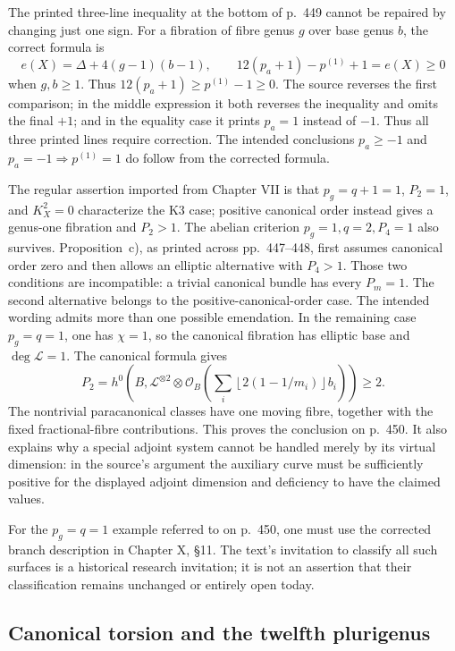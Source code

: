 The printed three-line inequality at the bottom of p.~449 cannot be repaired by changing just one sign. For a fibration of fibre genus \(g\) over base genus \(b\), the correct formula is
\[
e(X)=\Delta+4(g-1)(b-1),\qquad
12(p_a+1)-p^{(1)}+1=e(X)\ge0
\]
when \(g,b\ge1\). Thus \(12(p_a+1)\ge p^{(1)}-1\ge0\). The source reverses the first comparison; in the middle expression it both reverses the inequality and omits the final \(+1\); and in the equality case it prints \(p_a=1\) instead of \(-1\). Thus all three printed lines require correction. The intended conclusions \(p_a\ge-1\) and \(p_a=-1\Rightarrow p^{(1)}=1\) do follow from the corrected formula.

The regular assertion imported from Chapter VII is that \(p_g=q+1=1\), \(P_2=1\), and \(K_X^2=0\) characterize the K3 case; positive canonical order instead gives a genus-one fibration and \(P_2>1\). The abelian criterion \(p_g=1,q=2,P_4=1\) also survives. Proposition~c), as printed across pp.~447--448, first assumes canonical order zero and then allows an elliptic alternative with \(P_4>1\). Those two conditions are incompatible: a trivial canonical bundle has every \(P_m=1\). The second alternative belongs to the positive-canonical-order case. The intended wording admits more than one possible emendation. In the remaining case \(p_g=q=1\), one has \(\chi=1\), so the canonical fibration has elliptic base and \(\deg\mathcal L=1\). The canonical formula gives
\[
P_2=h^0\left(B,\mathcal L^{\otimes2}\otimes
 \mathcal O_B\left(\sum_i\left\lfloor2(1-1/m_i)\right\rfloor b_i\right)\right)\ge2.
\]
The nontrivial paracanonical classes have one moving fibre, together with the fixed fractional-fibre contributions. This proves the conclusion on p.~450. It also explains why a special adjoint system cannot be handled merely by its virtual dimension: in the source's argument the auxiliary curve must be sufficiently positive for the displayed adjoint dimension and deficiency to have the claimed values.

For the \(p_g=q=1\) example referred to on p.~450, one must use the corrected branch description in Chapter X, \S11. The text's invitation to classify all such surfaces is a historical research invitation; it is not an assertion that their classification remains unchanged or entirely open today.

\subsection{Canonical torsion and the twelfth plurigenus}

